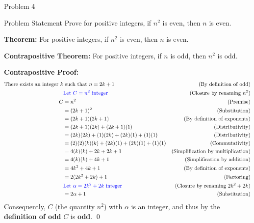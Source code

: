 \begin{problem}{Problem 4}
    \begin{statement}{Problem Statement}
        Prove for positive integers, if $n^{2}$ is even, then $n$ is even.
    \end{statement}

    \begin{highlight}[Solution]
        \textbf{Theorem:} For positive integers, if $n^{2}$ is even, then $n$ is even. \vspace{1em}

        \textbf{Contrapositive Theorem:} For positive integers, if $n$ is odd, then $n^{2}$ is odd. \vspace*{1em}

        \textbf{Contrapositive Proof:} \newline
        \begin{align*}
            \text{There exists an integer } k & \text{ such that } n = 2k + 1 & \text{(By definition of odd)} \\
            & \textcolor{blue}{\text{Let } C = n^{2} \text{ integer}} & \text{(Closure by renaming $n^{2}$)} \\
            C & = n^{2} & \text{(Premise)} \\
            & = (2k + 1)^{2} & \text{(Substitution)} \\
            & = (2k + 1)(2k + 1) & \text{(By definition of exponents)} \\
            & = (2k + 1)(2k) + (2k + 1)(1) & \text{(Distributivity)} \\
            & = (2k)(2k) + (1)(2k) + (2k)(1) + (1)(1) & \text{(Distributivity)} \\
            & = (2)(2)(k)(k) + (2k)(1) + (2k)(1) + (1)(1) & \text{(Commutativity)} \\
            & = 4(k)(k) + 2k + 2k + 1 & \text{(Simplification by multiplication)} \\
            & = 4(k)(k) + 4k + 1 & \text{(Simplification by addition)} \\
            & = 4k^{2} + 4k + 1 & \text{(By definition of exponents)} \\
            & = 2(2k^{2} + 2k) + 1 & \text{(Factoring)} \\
            & \textcolor{blue}{\text{Let } \alpha = 2k^{2} + 2k \text{ integer}} & \text{(Closure by renaming $2k^{2} + 2k$)} \\
            & = 2\alpha + 1 & \text{(Substitution)} \\
        \end{align*}
        Consequently, $C$ (the quantity $n^{2}$) with $\alpha$ is an integer, and thus by the \textbf{definition of odd} $C$ is \textbf{odd}. \qed 


\end{highlight}
\end{problem}
